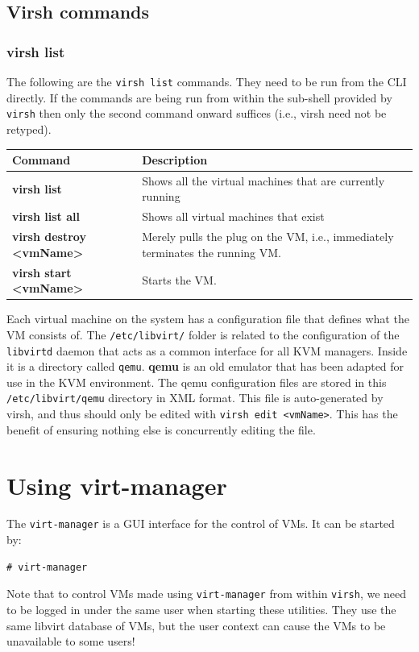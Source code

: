 \subsection{Virsh commands}
\subsubsection{virsh list}
\vspace{-10pt}
The following are the \verb|virsh list| commands. They need to be run from the CLI directly. If the commands are being run from within the sub-shell provided by \verb|virsh| then only the second command onward suffices (i.e., virsh need not be retyped). 

\noindent
\begin{tabular}{lM{0.64}}
	\toprule
	\textbf{Command} &\textbf{Description} \\
	\midrule
	\textbf{virsh list} &Shows all the virtual machines that are currently running \\
	\textbf{virsh list all} &Shows all virtual machines that exist \\
	\textbf{virsh destroy <vmName>} &Merely pulls the plug on the VM, i.e., immediately terminates the running VM. \\
	\textbf{virsh start <vmName>} &Starts the VM. \\
	\bottomrule
\end{tabular}

\noindent
Each virtual machine on the system has a configuration file that defines what the VM consists of. The \verb|/etc/libvirt/| folder is related to the configuration of the \verb|libvirtd| daemon that acts as a common interface for all KVM managers. Inside it is a directory called \verb|qemu|. \textbf{qemu} is an old emulator that has been adapted for use in the KVM environment. The qemu configuration files are stored in this \verb|/etc/libvirt/qemu| directory in XML format. This file is auto-generated by virsh, and thus should only be edited with \verb|virsh edit <vmName>|. This has the benefit of ensuring nothing else is concurrently editing the file. 

	\section{Using virt-manager}
The \verb|virt-manager| is a GUI interface for the control of VMs. It can be started by:

\vspace{-15pt}
\begin{verbatim}
# virt-manager
\end{verbatim}
\vspace{-10pt}

\noindent
Note that to control VMs made using \verb|virt-manager| from within \verb|virsh|, we need to be logged in under the same user when starting these utilities. They use the same libvirt database of VMs, but the user context can cause the VMs to be unavailable to some users!
